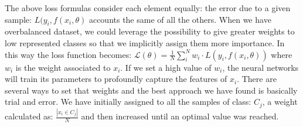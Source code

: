 \documentclass[LaM,binding=0.6cm]{sapthesis}
\begin{document}
The above loss formulas consider each element equally: the error due to a given sample: $L(y_i,f(x_i,\theta)$ accounts the same of all the others. When we have overbalanced dataset, we could leverage the possibility to give greater weights to low represented classes so that we implicitly assign them more importance. In this way the loss function becomes: $\mathcal{L}(\theta)=\frac{1}{N}\sum_{i}^{N}w_i\cdot L(y_i,f(x_i,\theta))$ where $w_i$ is the weight associated to $x_i$. If we set a high value of $w_i$, the neural networks will train its parameters to profoundly capture the features of $x_i$. There are several ways to set that weights and the best approach we have found is basically trial and error. We have initially assigned to all the samples of class: $C_j$, a weight calculated as: $\frac{\left|x_i\in C_j\right|}{N}$ and then increased until an optimal value was reached.
\end{document}
